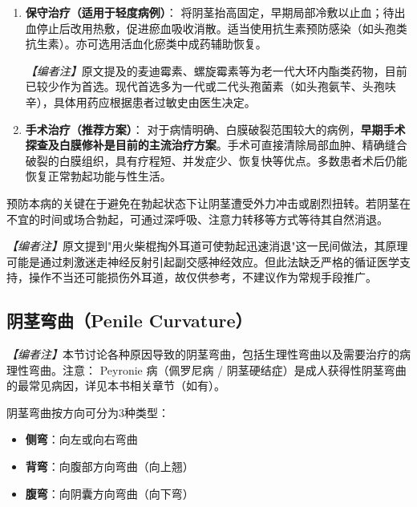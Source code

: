 \begin{enumerate}
	\item \textbf{保守治疗（适用于轻度病例）}：
	将阴茎抬高固定，早期局部冷敷以止血；待出血停止后改用热敷，促进瘀血吸收消散。适当使用抗生素预防感染（如头孢类抗生素）。亦可选用活血化瘀类中成药辅助恢复。

	\noindent\textit{【编者注】}原文提及的麦迪霉素、螺旋霉素等为老一代大环内酯类药物，目前已较少作为首选。现代首选多为一代或二代头孢菌素（如头孢氨苄、头孢呋辛），具体用药应根据患者过敏史由医生决定。

	\item \textbf{手术治疗（推荐方案）}：
	对于病情明确、白膜破裂范围较大的病例，\textbf{早期手术探查及白膜修补是目前的主流治疗方案}。手术可直接清除局部血肿、精确缝合破裂的白膜组织，具有疗程短、并发症少、恢复快等优点。多数患者术后仍能恢复正常勃起功能与性生活。
\end{enumerate}

\begin{tcolorbox}[colback=pink!5!white,colframe=red!50!black,title=贴心小叮咛]
预防本病的关键在于避免在勃起状态下让阴茎遭受外力冲击或剧烈扭转。若阴茎在不宜的时间或场合勃起，可通过深呼吸、注意力转移等方式等待其自然消退。

\noindent\textit{【编者注】}原文提到"用火柴棍掏外耳道可使勃起迅速消退"这一民间做法，其原理可能是通过刺激迷走神经反射引起副交感神经效应。但此法缺乏严格的循证医学支持，操作不当还可能损伤外耳道，故仅供参考，不建议作为常规手段推广。
\end{tcolorbox}

\subsection{阴茎弯曲（Penile Curvature）}
\label{subsec:penile_curvature}

\noindent\textit{【编者注】}本节讨论各种原因导致的阴茎弯曲，包括生理性弯曲以及需要治疗的病理性弯曲。注意： Peyronie 病（佩罗尼病 / 阴茎硬结症）是成人获得性阴茎弯曲的最常见病因，详见本书相关章节（如有）。

\vspace{0.5em}
阴茎弯曲按方向可分为3种类型：
\begin{itemize}
	\item \textbf{侧弯}：向左或向右弯曲
	\item \textbf{背弯}：向腹部方向弯曲（向上翘）
	\item \textbf{腹弯}：向阴囊方向弯曲（向下弯）
\end{itemize}

